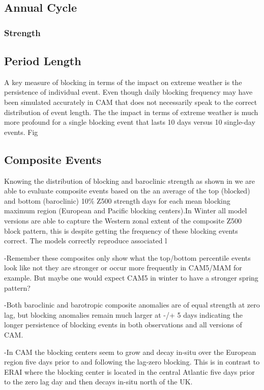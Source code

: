 \documentclass[12pt,varwidth]{article}
\begin{document}
\subsection{Annual Cycle}
\subsubsection{Strength}

\subsection{Period Length}

A key measure of blocking in terms of the impact on extreme weather is the persistence of individual event. Even though daily blocking frequency may have been simulated accurately in CAM that does not necessarily speak to the correct distribution of event length. The the impact in terms of extreme weather is much more profound for a single blocking event that lasts 10 days versus 10 single-day events. Fig \

\subsection{Composite Events}
Knowing the distribution of blocking and baroclinic strength as shown in \label{} we are able to evaluate composite events based on the an average of the top (blocked) and bottom (baroclinic) 10\% Z500 strength days for each mean blocking maximum region (European and Pacific blocking centers).In Winter all model versions are able to capture the Western zonal extent of the composite Z500 block pattern, this is despite getting the frequency of these blocking events correct. The models correctly reproduce associated l

-Remember these composites only show what the top/bottom percentile events look like not they are stronger or occur more frequently in CAM5/MAM for example. But maybe one would expect CAM5 in winter to have a stronger spring pattern?

-Both baroclinic and barotropic composite anomalies are of equal strength at zero lag, but blocking anomalies remain much larger at -/+ 5 days indicating the longer persistence of blocking events in both observations and all versions of CAM.

-In CAM the blocking centers seem to grow and decay in-situ over the European region five days prior to and following the lag-zero blocking. This is in contrast to ERAI where the blocking center is located in the central Atlantic five days prior to the zero lag day and then decays in-situ north of the UK.
\end{document}
